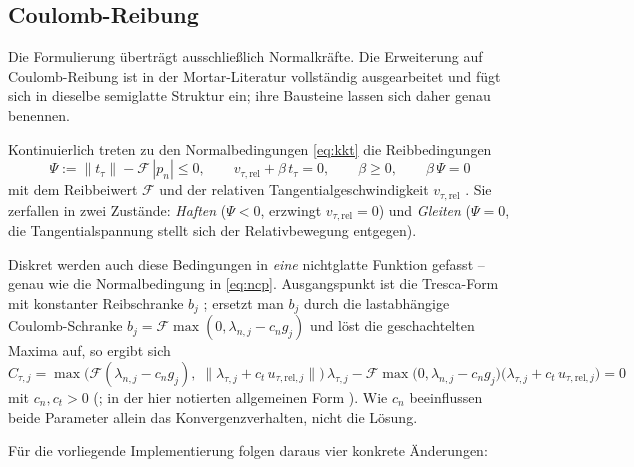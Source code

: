\documentclass[a4paper,11pt]{article}
\def\bm#1{#1}%
\def\tilde#1{#1}%
\begin{document}
\subsection{Coulomb-Reibung}
\label{sec:ausblick:reibung}

Die Formulierung überträgt ausschließlich Normalkräfte. Die Erweiterung auf Coulomb-Reibung ist in
der Mortar-Literatur vollständig ausgearbeitet und fügt sich in dieselbe semiglatte Struktur ein;
ihre Bausteine lassen sich daher genau benennen.

Kontinuierlich treten zu den Normalbedingungen \eqref{eq:kkt} die Reibbedingungen
\begin{equation}
\Psi := \|\bm t_\tau\| - \mathcal F\,|p_n| \le 0,
\qquad
\bm v_{\tau,\text{rel}} + \beta\,\bm t_\tau = \bm 0,
\qquad
\beta \ge 0,
\qquad
\beta\,\Psi = 0
\label{eq:coulomb}
\end{equation}
mit dem Reibbeiwert $\mathcal F$ und der relativen Tangentialgeschwindigkeit
$\bm v_{\tau,\text{rel}}$ \citep[Gl.~(10)--(13), S.~546--547]{gitterle}. Sie zerfallen in zwei
Zustände: \emph{Haften} ($\Psi<0$, erzwingt $\bm v_{\tau,\text{rel}}=\bm 0$) und \emph{Gleiten}
($\Psi=0$, die Tangentialspannung stellt sich der Relativbewegung entgegen).

Diskret werden auch diese Bedingungen in \emph{eine} nichtglatte Funktion gefasst -- genau wie die
Normalbedingung in \eqref{eq:ncp}. Ausgangspunkt ist die Tresca-Form mit konstanter Reibschranke
$b_j$ \citep[Gl.~(58)]{gitterle}; ersetzt man $b_j$ durch die lastabhängige Coulomb-Schranke
$b_j=\mathcal F\max(0,\lambda_{n,j}-c_n\tilde g_j)$ \citep[Gl.~(60)]{gitterle} und löst die
geschachtelten Maxima auf, so ergibt sich
\begin{equation}
C_{\tau,j} = \max\!\big(\mathcal F(\lambda_{n,j}-c_n\tilde g_{j}),\;
\|\bm\lambda_{\tau,j}+c_t\,\tilde{\bm u}_{\tau,\text{rel},j}\|\big)\,\bm\lambda_{\tau,j}
- \mathcal F\max\!\big(0,\lambda_{n,j}-c_n\tilde g_{j}\big)
\big(\bm\lambda_{\tau,j}+c_t\,\tilde{\bm u}_{\tau,\text{rel},j}\big) = \bm 0
\label{eq:ncptau}
\end{equation}
mit $c_n,c_t>0$ (\citealp[Gl.~(61)/(62)]{gitterle}; in der hier notierten allgemeinen Form
\citealp[Gl.~(3.60)/(3.61)]{farah}). Wie $c_n$ beeinflussen beide Parameter allein das
Konvergenzverhalten, nicht die Lösung.

Für die vorliegende Implementierung folgen daraus vier konkrete Änderungen:
\end{document}
